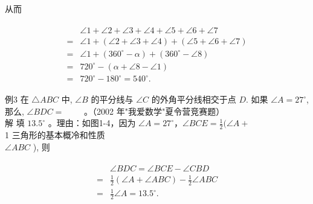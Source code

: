 \documentclass[10pt]{article}
\begin{document}
从而

\begin{align*}
\begin{aligned}
& \angle 1+\angle 2+\angle 3+\angle 4+\angle 5+\angle 6+\angle 7 \\
= & \angle 1+(\angle 2+\angle 3+\angle 4)+(\angle 5+\angle 6+\angle 7) \\
= & \angle 1+\left(360^{\circ}-\alpha\right)+\left(360^{\circ}-\angle 8\right) \\
= & 720^{\circ}-(\alpha+\angle 8-\angle 1) \\
= & 720^{\circ}-180^{\circ}=540^{\circ} .
\end{aligned}
\end{align*}

例3 在 $\triangle A B C$ 中, $\angle B$ 的平分线与 $\angle C$ 的外角平分线相交于点 $D$. 如果 $\angle A=27^{\circ}$, 那么, $\angle B D C=$ $\qquad$。（2002 年"我爱数学"夏令营竞赛题）\\
解 填 $13.5^{\circ}$ 。理由：如图1-4，因为 $\angle A=27^{\circ} ， \angle B C E=\frac{1}{2}(\angle A+$\\
1 三角形的基本概冷和性质\\
$\angle A B C$ ), 则

\begin{align*}
\begin{aligned}
& \angle B D C=\angle B C E-\angle C B D \\
= & \frac{1}{2}(\angle A+\angle A B C)-\frac{1}{2} \angle A B C \\
= & \frac{1}{2} \angle A=13.5^{\circ} .
\end{aligned}
\end{align*}
\end{document}
